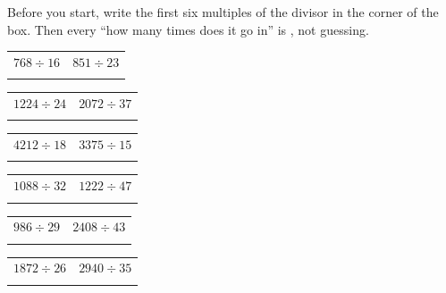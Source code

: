 \documentclass[12pt,a4paper]{article}
\begin{document}
\begin{remember}
  Before you start, write the first six multiples of the divisor in the corner of
  the box. Then every ``how many times does it go in'' is , not
  guessing.
\end{remember}

\vspace{4pt}
\noindent
\begin{tabularx}{\textwidth}{|X|X|}
  \hline
  $768 \div 16$ & $851 \div 23$ \\
  \rule[-4.0em]{0pt}{4.8em} & \\
  \hline
\end{tabularx}

\vspace{9pt}
\noindent
\begin{tabularx}{\textwidth}{|X|X|}
  \hline
  $1224 \div 24$ & $2072 \div 37$ \\
  \rule[-4.0em]{0pt}{4.8em} & \\
  \hline
\end{tabularx}

\vspace{9pt}
\noindent
\begin{tabularx}{\textwidth}{|X|X|}
  \hline
  $4212 \div 18$ & $3375 \div 15$ \\
  \rule[-4.0em]{0pt}{4.8em} & \\
  \hline
\end{tabularx}

\vspace{9pt}
\noindent
\begin{tabularx}{\textwidth}{|X|X|}
  \hline
  $1088 \div 32$ & $1222 \div 47$ \\
  \rule[-4.0em]{0pt}{4.8em} & \\
  \hline
\end{tabularx}

\vspace{9pt}
\noindent
\begin{tabularx}{\textwidth}{|X|X|}
  \hline
  $986 \div 29$ & $2408 \div 43$ \\
  \rule[-4.0em]{0pt}{4.8em} & \\
  \hline
\end{tabularx}

\vspace{9pt}
\noindent
\begin{tabularx}{\textwidth}{|X|X|}
  \hline
  $1872 \div 26$ & $2940 \div 35$ \\
  \rule[-4.0em]{0pt}{4.8em} & \\
  \hline
\end{tabularx}
\end{document}
